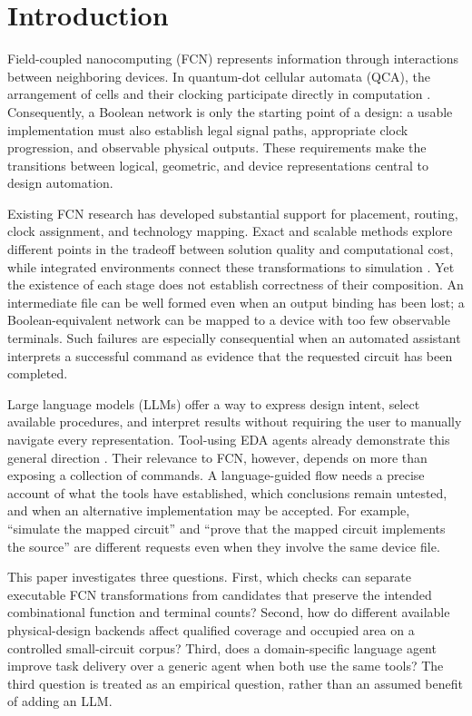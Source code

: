 \documentclass[ASNA,twocolumn]{USG}
\begin{document}
\section{Introduction}\label{sec:intro}
Field-coupled nanocomputing (FCN) represents information through interactions between neighboring devices. In quantum-dot cellular automata (QCA), the arrangement of cells and their clocking participate directly in computation \cite{Lent1993QCA}. Consequently, a Boolean network is only the starting point of a design: a usable implementation must also establish legal signal paths, appropriate clock progression, and observable physical outputs. These requirements make the transitions between logical, geometric, and device representations central to design automation.

Existing FCN research has developed substantial support for placement, routing, clock assignment, and technology mapping. Exact and scalable methods explore different points in the tradeoff between solution quality and computational cost, while integrated environments connect these transformations to simulation \cite{Walter2018ExactQCA,Walter2019ScalableFCN,Li2026iFCN}. Yet the existence of each stage does not establish correctness of their composition. An intermediate file can be well formed even when an output binding has been lost; a Boolean-equivalent network can be mapped to a device with too few observable terminals. Such failures are especially consequential when an automated assistant interprets a successful command as evidence that the requested circuit has been completed.

Large language models (LLMs) offer a way to express design intent, select available procedures, and interpret results without requiring the user to manually navigate every representation. Tool-using EDA agents already demonstrate this general direction \cite{Wu2024ChatEDA,Wu2025EDAid}. Their relevance to FCN, however, depends on more than exposing a collection of commands. A language-guided flow needs a precise account of what the tools have established, which conclusions remain untested, and when an alternative implementation may be accepted. For example, ``simulate the mapped circuit'' and ``prove that the mapped circuit implements the source'' are different requests even when they involve the same device file.

This paper investigates three questions. First, which checks can separate executable FCN transformations from candidates that preserve the intended combinational function and terminal counts? Second, how do different available physical-design backends affect qualified coverage and occupied area on a controlled small-circuit corpus? Third, does a domain-specific language agent improve task delivery over a generic agent when both use the same tools? The third question is treated as an empirical question, rather than an assumed benefit of adding an LLM.
\end{document}
